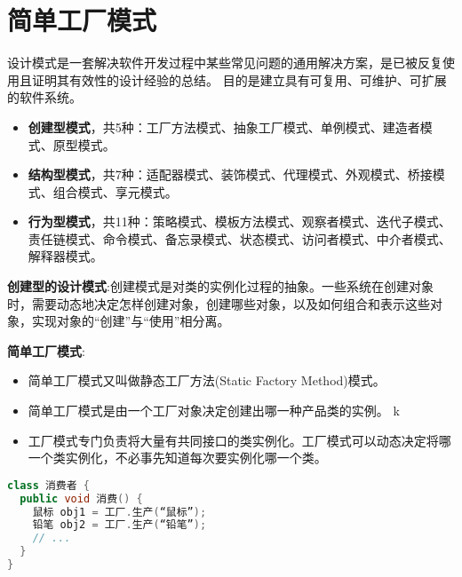 \documentclass[../main.tex]{subfiles}
\begin{document}
\section{简单工厂模式}
设计模式是一套解决软件开发过程中某些常见问题的通用解决方案，是已被反复使用且证明其有效性的设计经验的总结。
目的是建立具有可复用、可维护、可扩展的软件系统。
\begin{itemize}
  \item \textbf{创建型模式}，共5种：工厂方法模式、抽象工厂模式、单例模式、建造者模式、原型模式。
  \item \textbf{结构型模式}，共7种：适配器模式、装饰模式、代理模式、外观模式、桥接模式、组合模式、享元模式。
  \item \textbf{行为型模式}，共11种：策略模式、模板方法模式、观察者模式、迭代子模式、责任链模式、命令模式、备忘录模式、状态模式、访问者模式、中介者模式、解释器模式。
\end{itemize}
\textbf{创建型的设计模式}:创建模式是对类的实例化过程的抽象。一些系统在创建对象时，需要动态地决定怎样创建对象，创建哪些对象，以及如何组合和表示这些对象，实现对象的``创建''与``使用''相分离。

\textbf{简单工厂模式}:
\begin{itemize}
  \item 简单工厂模式又叫做静态工厂方法(Static Factory Method)模式。
  \item 简单工厂模式是由一个工厂对象决定创建出哪一种产品类的实例。
k \item 工厂模式专门负责将大量有共同接口的类实例化。工厂模式可以动态决定将哪一个类实例化，不必事先知道每次要实例化哪一个类。
\end{itemize}
\begin{lstlisting}[language=java]
class 消费者 {
  public void 消费() {
    鼠标 obj1 = 工厂.生产(“鼠标”);
    铅笔 obj2 = 工厂.生产(“铅笔”);
    // ...
  }
}
\end{lstlisting}
%
\end{document}
